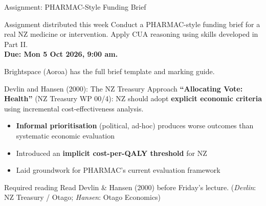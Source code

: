 \documentclass[aspectratio=169, 12pt]{beamer}
\begin{document}
\begin{frame}{Assignment: PHARMAC-Style Funding Brief}
  \begin{exampleblock}{Assignment distributed this week}
    Conduct a PHARMAC-style funding brief for a real NZ medicine or intervention.
    Apply CUA reasoning using skills developed in Part II.\\[0.4em]
    \textbf{Due: Mon 5 Oct 2026, 9:00 am.}
  \end{exampleblock}
  \vspace{0.5em}
  Brightspace (Aoroa) has the full brief template and marking guide.
\end{frame}

\begin{frame}{Devlin and Hansen (2000): The NZ Treasury Approach}
  \small
  \textbf{``Allocating Vote: Health''} (NZ Treasury WP 00/4): NZ should adopt
  \textbf{explicit economic criteria} using incremental cost-effectiveness analysis.
  \vspace{0.2em}
  \begin{itemize}
    \item \textbf{Informal prioritisation} (political, ad-hoc) produces worse outcomes
          than systematic economic evaluation
    \item Introduced an \textbf{implicit cost-per-QALY threshold} for NZ
    \item Laid groundwork for PHARMAC's current evaluation framework
  \end{itemize}
  \vspace{0.2em}
  \begin{alertblock}{Required reading}
    \small Read Devlin \& Hansen (2000) before Friday's lecture. (\textit{Devlin}: NZ Treasury / Otago; \textit{Hansen}: Otago Economics)
  \end{alertblock}
\end{frame}

\end{document}
